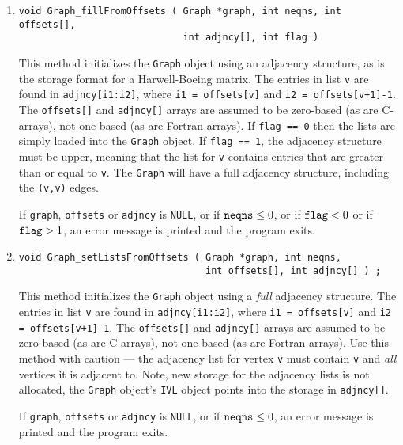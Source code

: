 \begin{enumerate}
the {\tt Graph} object and will be free'd when the {\tt Graph}
object is free'd.
\par {}
If {\tt graph} or {\tt adjIVL} is {\tt NULL},
{\tt type} is invalid ({\tt type} must be in {\tt [0,3]}),
{\tt nvtx} is non-positive,
{\tt nvbnd} or {\tt nedges} is negative, 
or if {\tt type \% 2 = 1} and {\tt vwghts} is {\tt NULL},
or if ${\tt type} \ge 2$ and {\tt ewghtIVL} is {\tt NULL},
an error message is printed and the program exits.
\item
\begin{verbatim}
void Graph_fillFromOffsets ( Graph *graph, int neqns, int offsets[],
                             int adjncy[], int flag )
\end{verbatim}
This method initializes the {\tt Graph} object using an adjacency
structure, as is the storage format for a Harwell-Boeing matrix.
The entries in list {\tt v} are found in {\tt adjncy[i1:i2]}, where 
{\tt i1 = offsets[v]} and {\tt i2 = offsets[v+1]-1}.
The {\tt offsets[]} and {\tt adjncy[]} arrays are assumed to be
zero-based (as are C-arrays), not one-based (as are Fortran arrays).
If {\tt flag == 0} then the lists are simply loaded 
into the {\tt Graph} object.
If {\tt flag == 1}, the adjacency structure must be upper, meaning
that the list for {\tt v} contains entries that are greater than or
equal to {\tt v}.
The {\tt Graph} will have a full adjacency
structure, including the {\tt (v,v)} edges.
\par {}
If {\tt graph}, {\tt offsets} or {\tt adjncy} is {\tt NULL},
or if ${\tt neqns} \le 0$,
or if ${\tt flag} < 0$ or if ${\tt flag} > 1$,
an error message is printed and the program exits.
\item
\begin{verbatim}
void Graph_setListsFromOffsets ( Graph *graph, int neqns, 
                                 int offsets[], int adjncy[] ) ;
\end{verbatim}
This method initializes the {\tt Graph} object using a {\it full}
adjacency structure.
The entries in list {\tt v} are found in {\tt adjncy[i1:i2]}, where 
{\tt i1 = offsets[v]} and {\tt i2 = offsets[v+1]-1}.
The {\tt offsets[]} and {\tt adjncy[]} arrays are assumed to be
zero-based (as are C-arrays), not one-based (as are Fortran arrays).
Use this method with caution --- the adjacency list for vertex 
{\tt v} must contain {\tt v} and {\it all} vertices it is adjacent to.
Note, new storage for the adjacency lists is not allocated, the
{\tt Graph} object's {\tt IVL} object points into the storage
in {\tt adjncy[]}.
\par {}
If {\tt graph}, {\tt offsets} or {\tt adjncy} is {\tt NULL},
or if ${\tt neqns} \le 0$,
an error message is printed and the program exits.
\end{enumerate}
\par
